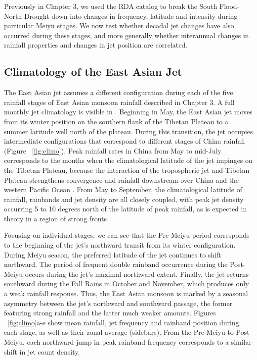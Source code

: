 	Previously in Chapter 3, we used the RDA catalog to break the South Flood-North Drought down into changes in frequency, latitude and intensity during particular Meiyu stages. We now test whether decadal jet changes have also occurred during these stages, and more generally whether interannual changes in rainfall properties and changes in jet position are correlated.
	
\subsection{Climatology of the East Asian Jet}

	The East Asian jet assumes a different configuration during each of the five rainfall stages of East Asian monsoon rainfall described in Chapter 3. A full monthly jet climatology is visible in \citet{Schiemann2009}. Beginning in May, the East Asian jet moves from its winter position on the southern flank of the Tibetan Plateau to a summer latitude well north of the plateau. During this transition, the jet occupies intermediate configurations that correspond to different stages of China rainfall (Figure ~\ref{fig:climo}). Peak rainfall rates in China from May to mid-July corresponds to the months when the climatological latitude of the jet impinges on the Tibetan Plateau, because the interaction of the tropospheric jet and Tibetan Plateau strengthens convergence and rainfall downstream over China and the western Pacific Ocean \citep{Molnar2010,Sampe2010,Chen2014}. From May to September,  the climatological latitude of rainfall, rainbands and jet density are all closely coupled, with peak jet density occurring 5 to 10 degrees north of the latitude of peak rainfall, as is expected in theory in a region of strong fronts \citep{Holton2004}. 
	
	Focusing on individual stages, we can see that the Pre-Meiyu period corresponds to the beginning of the jet's northward transit from its winter configuration. During Meiyu season, the preferred latitude of the jet continues to shift northward. The period of frequent double rainband occurrence during the Post-Meiyu occurs during the jet's maximal northward extent. Finally, the jet returns southward during the Fall Rains in October and November, which produces only a weak rainfall response. Thus, the East Asian monsoon is marked by a seasonal asymmetry between the jet's northward and southward passage, the former featuring strong rainfall and the latter much weaker amounts. Figures ~\ref{fig:climo}a-e show mean rainfall, jet frequency and rainband position during each stage, as well as their zonal average (sidebars). From the Pre-Meiyu to Post-Meiyu, each northward jump in peak rainband frequency corresponds to a similar shift in jet count density.
	
